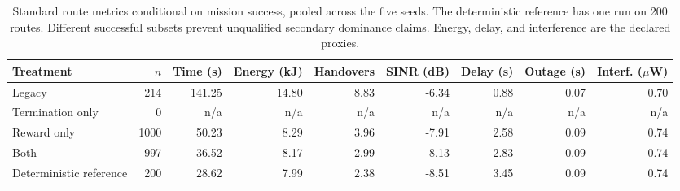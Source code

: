 \begin{table}[t]
\caption{Standard route metrics conditional on mission success, pooled across the five seeds. The deterministic reference has one run on 200 routes. Different successful subsets prevent unqualified secondary dominance claims. Energy, delay, and interference are the declared proxies.}
\label{tab:metrics}\centering\footnotesize
\begin{tabular}{lrrrrrrrr}\toprule
Treatment & $n$ & Time (s) & Energy (kJ) & Handovers & SINR (dB) & Delay (s) & Outage (s) & Interf. ($\mu$W)\\\midrule
Legacy & 214 & 141.25 & 14.80 & 8.83 & -6.34 & 0.88 & 0.07 & 0.70 \\
Termination only & 0 & n/a & n/a & n/a & n/a & n/a & n/a & n/a \\
Reward only & 1000 & 50.23 & 8.29 & 3.96 & -7.91 & 2.58 & 0.09 & 0.74 \\
Both & 997 & 36.52 & 8.17 & 2.99 & -8.13 & 2.83 & 0.09 & 0.74 \\
Deterministic reference & 200 & 28.62 & 7.99 & 2.38 & -8.51 & 3.45 & 0.09 & 0.74 \\
\bottomrule\end{tabular}
\end{table}
